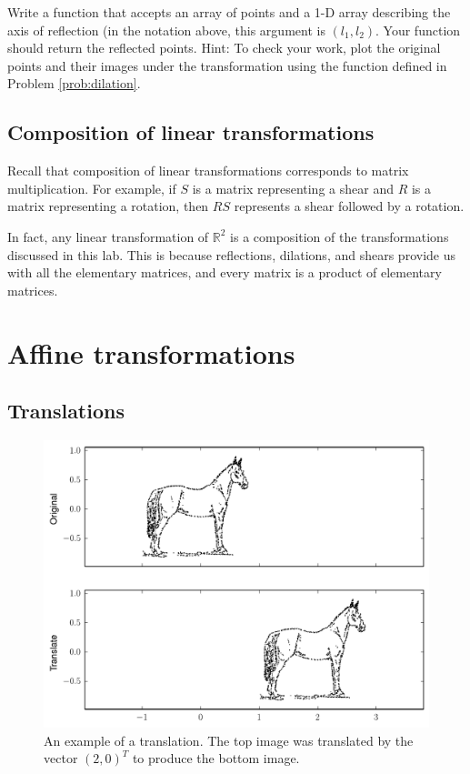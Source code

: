 \begin{problem}[Optional]
Write a function that accepts an array of points and a 1-D array describing the axis of reflection (in the notation above, this argument is $(l_1, l_2)$. 
Your function should return the reflected points. 
Hint: To check your work, plot the original points and their images under the transformation using the function  defined in Problem \ref{prob:dilation}.
\end{problem}

\subsection*{Composition of linear transformations}
Recall that composition of linear transformations corresponds to matrix multiplication. 
For example, if $S$ is a matrix representing a shear and $R$ is a matrix representing a rotation, then $RS$ represents a shear followed by a rotation.

In fact, any linear transformation of $\mathbb{R}^2$ is a composition of the transformations discussed in this lab. 
This is because reflections, dilations, and shears provide us with all the elementary matrices, and every matrix is a product of elementary matrices. 

\section*{Affine transformations}
\subsection*{Translations}

\begin{figure}
\includegraphics[width=\textwidth]{translate.pdf}
\caption{
An example of a translation.
The top image was translated by the vector $(2, 0)^T$ to produce the bottom image.}
\label{fig:translation}
\end{figure}

